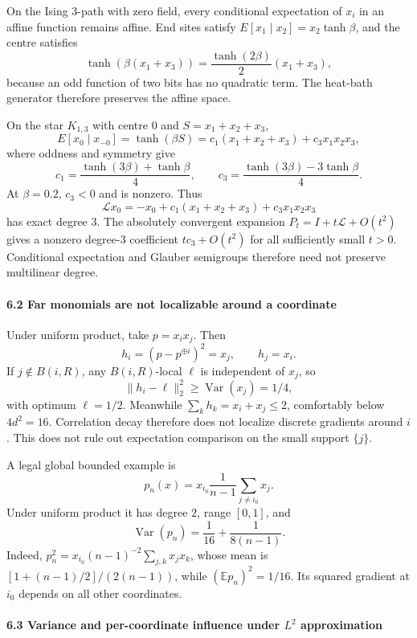 On the Ising 3-path with zero field, every conditional expectation of \(x_i\) in an affine function remains affine. End sites satisfy \(E[x_1\mid x_2]=x_2\tanh\beta\), and the centre satisfies
\[\tanh(\beta(x_1+x_3))=\frac{\tanh(2\beta)}2(x_1+x_3),\]
because an odd function of two bits has no quadratic term. The heat-bath generator therefore preserves the affine space.

On the star \(K_{1,3}\) with centre \(0\) and \(S=x_1+x_2+x_3\),
\[E[x_0\mid x_{-0}]=\tanh(\beta S)
=c_1(x_1+x_2+x_3)+c_3x_1x_2x_3,\]
where oddness and symmetry give
\[c_1=\frac{\tanh(3\beta)+\tanh\beta}{4},
\qquad
c_3=\frac{\tanh(3\beta)-3\tanh\beta}{4}.\]
At \(\beta=0.2\), \(c_3<0\) and is nonzero. Thus
\[\mathcal Lx_0=-x_0+c_1(x_1+x_2+x_3)+c_3x_1x_2x_3\]
has exact degree \(3\). The absolutely convergent expansion \(P_t=I+t\mathcal L+O(t^2)\) gives a nonzero degree-\(3\) coefficient \(tc_3+O(t^2)\) for all sufficiently small \(t>0\). Conditional expectation and Glauber semigroups therefore need not preserve multilinear degree.

\paragraph{6.2 Far monomials are not localizable around a coordinate}\label{far-monomials-are-not-localizable-around-a-coordinate}

Under uniform product, take \(p=x_ix_j\). Then
\[h_i=(p-p^{\oplus i})^2=x_j,\qquad h_j=x_i.\]
If \(j\notin B(i,R)\), any \(B(i,R)\)-local \(\ell\) is independent of \(x_j\), so
\[\|h_i-\ell\|_2^2\ge\operatorname{Var}(x_j)=1/4,\]
with optimum \(\ell=1/2\). Meanwhile \(\sum_kh_k=x_i+x_j\le2\), comfortably below \(4d^2=16\). Correlation decay therefore does not localize discrete gradients around \(i\). This does not rule out expectation comparison on the small support \(\{j\}\).

A legal global bounded example is
\[p_n(x)=x_{i_0}\frac1{n-1}\sum_{j\ne i_0}x_j.\]
Under uniform product it has degree \(2\), range \([0,1]\), and
\[\operatorname{Var}(p_n)=\frac1{16}+\frac1{8(n-1)}.\]
Indeed, \(p_n^2=x_{i_0}(n-1)^{-2}\sum_{j,k}x_jx_k\), whose mean is \([1+(n-1)/2]/(2(n-1))\), while \((\mathbb Ep_n)^2=1/16\). Its squared gradient at \(i_0\) depends on all other coordinates.

\paragraph{\texorpdfstring{6.3 Variance and per-coordinate influence under \(L^2\) approximation}{6.3 Variance and per-coordinate influence under L\^{}2 approximation}}\label{variance-and-per-coordinate-influence-under-l2-approximation}

